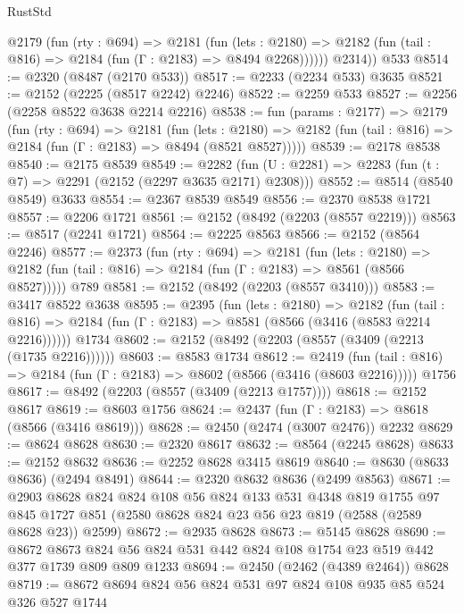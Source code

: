 \begin{lexlean}{RustStd}
\begin{coremodule}
          @2179
            (fun (rty : @694) =>
            @2181
              (fun (lets : @2180) =>
              @2182 (fun (tail : @816) => @2184 (fun (Γ : @2183) => @8494 @2268))))))
        @2314))
    @533
@8514 := @2320 (@8487 (@2170 @533))
@8517 := @2233 (@2234 @533) @3635
@8521 := @2152 (@2225 (@8517 @2242) @2246)
@8522 := @2259 @533
@8527 := @2256 (@2258 @8522 @3638 @2214 @2216)
@8538 := fun (params : @2177) =>
  @2179
    (fun (rty : @694) =>
    @2181
      (fun (lets : @2180) =>
      @2182 (fun (tail : @816) => @2184 (fun (Γ : @2183) => @8494 (@8521 @8527)))))
@8539 := @2178 @8538
@8540 := @2175 @8539
@8549 := @2282 (fun (U : @2281) => @2283 (fun (t : @7) => @2291 (@2152 (@2297 @3635 @2171) @2308)))
@8552 := @8514 (@8540 @8549) @3633
@8554 := @2367 @8539 @8549
@8556 := @2370 @8538 @1721
@8557 := @2206 @1721
@8561 := @2152 (@8492 (@2203 (@8557 @2219)))
@8563 := @8517 (@2241 @1721)
@8564 := @2225 @8563
@8566 := @2152 (@8564 @2246)
@8577 := @2373
    (fun (rty : @694) =>
    @2181
      (fun (lets : @2180) =>
      @2182 (fun (tail : @816) => @2184 (fun (Γ : @2183) => @8561 (@8566 @8527)))))
    @789
@8581 := @2152 (@8492 (@2203 (@8557 @3410)))
@8583 := @3417 @8522 @3638
@8595 := @2395
    (fun (lets : @2180) =>
    @2182
      (fun (tail : @816) => @2184 (fun (Γ : @2183) => @8581 (@8566 (@3416 (@8583 @2214 @2216))))))
    @1734
@8602 := @2152 (@8492 (@2203 (@8557 (@3409 (@2213 (@1735 @2216))))))
@8603 := @8583 @1734
@8612 := @2419
    (fun (tail : @816) => @2184 (fun (Γ : @2183) => @8602 (@8566 (@3416 (@8603 @2216)))))
    @1756
@8617 := @8492 (@2203 (@8557 (@3409 (@2213 @1757))))
@8618 := @2152 @8617
@8619 := @8603 @1756
@8624 := @2437 (fun (Γ : @2183) => @8618 (@8566 (@3416 @8619)))
@8628 := @2450 (@2474 (@3007 @2476)) @2232
@8629 := @8624 @8628
@8630 := @2320 @8617
@8632 := @8564 (@2245 @8628)
@8633 := @2152 @8632
@8636 := @2252 @8628 @3415 @8619
@8640 := @8630 (@8633 @8636) (@2494 @8491)
@8644 := @2320 @8632 @8636 (@2499 @8563)
@8671 := @2903
    @8628
    @824
    @824
    @108
    @56
    @824
    @133
    @531
    @4348
    @819
    @1755
    @97
    @845
    @1727
    @851
    (@2580 @8628 @824 @23 @56 @23 @819 (@2588 (@2589 @8628 @23)) @2599)
@8672 := @2935 @8628
@8673 := @5145 @8628
@8690 := @8672
    @8673
    @824
    @56
    @824
    @531
    @442
    @824
    @108
    @1754
    @23
    @519
    @442
    @377
    @1739
    @809
    @809
    @1233
@8694 := @2450 (@2462 (@4389 @2464)) @8628
@8719 := @8672
    @8694
    @824
    @56
    @824
    @531
    @97
    @824
    @108
    @935
    @85
    @524
    @326
    @527
    @1744

\end{coremodule}
\end{lexlean}
